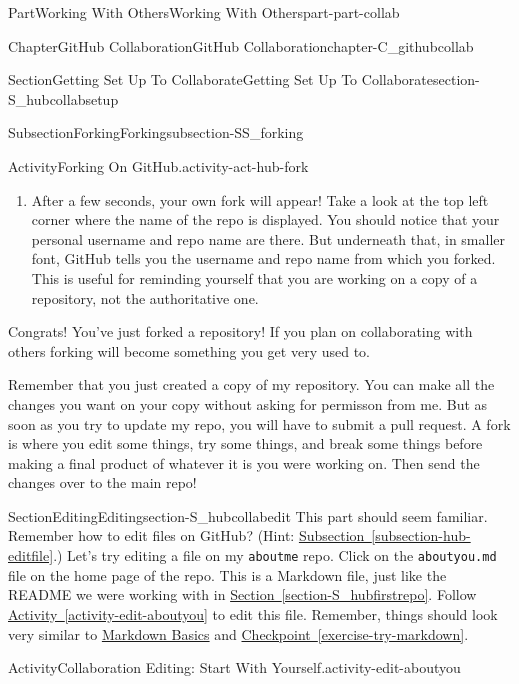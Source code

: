 \documentclass[oneside,10pt,]{book}
\newcommand{\xreffont}{\relax}
\newcommand{\mono}[1]{\texttt{#1}}
\begin{document}
\begin{partptx}{Part}{Working With Others}{}{Working With Others}{}{}{part-part-collab}
\begin{chapterptx}{Chapter}{GitHub Collaboration}{}{GitHub Collaboration}{}{}{chapter-C_githubcollab}
\begin{sectionptx}{Section}{Getting Set Up To Collaborate}{}{Getting Set Up To Collaborate}{}{}{section-S_hubcollabsetup}
\begin{subsectionptx}{Subsection}{Forking}{}{Forking}{}{}{subsection-SS_forking}
\begin{activity}{Activity}{Forking On GitHub.}{activity-act-hub-fork}
\begin{enumerate}[font=\bfseries,label=(\alph*),ref=\alph*]
\par
Click on the Create Fork button.%
\item{}After a few seconds, your own fork will appear! Take a look at the top left corner where the name of the repo is displayed. You should notice that your personal username and repo name are there. But underneath that, in smaller font, GitHub tells you the username and repo name from which you forked. This is useful for reminding yourself that you are working on a copy of a repository, not the authoritative one.%
\end{enumerate}%
\end{activity}%
%
Congrats! You've just forked a repository! If you plan on collaborating with others forking will become something you get very used to.%
\par
Remember that you just created a copy of my repository. You can make all the changes you want on your copy without asking for permisson from me. But as soon as you try to update my repo, you will have to submit a pull request. A fork is where you edit some things, try some things, and break some things before making a final product of whatever it is you were working on. Then send the changes over to the main repo!%
\end{subsectionptx}
\end{sectionptx}
%
%
\typeout{************************************************}
\typeout{************************************************}
%
\begin{sectionptx}{Section}{Editing}{}{Editing}{}{}{section-S_hubcollabedit}
%
%
This part should seem familiar. Remember how to edit files on GitHub? (Hint: \hyperref[subsection-hub-editfile]{Subsection~{\xreffont\ref{subsection-hub-editfile}}}.) Let's try editing a file on my \mono{aboutme} repo. Click on the \mono{aboutyou.md} file on the home page of the repo. This is a Markdown file, just like the README we were working with in \hyperref[section-S_hubfirstrepo]{Section~{\xreffont\ref{section-S_hubfirstrepo}}}. Follow \hyperref[activity-edit-aboutyou]{Activity~{\xreffont\ref{activity-edit-aboutyou}}} to edit this file. Remember, things should look very similar to \hyperref[assemblage-markdown]{Markdown Basics} and \hyperref[exercise-try-markdown]{Checkpoint~{\xreffont\ref{exercise-try-markdown}}}.%
\begin{activity}{Activity}{Collaboration Editing: Start With Yourself.}{activity-edit-aboutyou}%

\end{activity}
\end{sectionptx}
\end{chapterptx}
\end{partptx}
\end{document}
